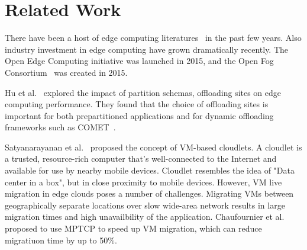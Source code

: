 \section{Related Work}
\label{sec:related}

There have been a host of edge computing literatures~\cite{edge-computing,edgecloudsim,cloudlets09,Cloudlets12,hu-apsys16,ChaufournierSLN17}
in the past few years.
Also industry investment in edge computing have grown dramatically recently.
The Open Edge Computing\cite{url:openedgecomputing} initiative was launched in 2015,
and the Open Fog Consortium~\cite{url:openfog} was created in 2015.

Hu et al.~\cite{hu-apsys16} explored the impact of partition schemas, offloading sites on edge computing performance.
They found that the choice of offloading sites is important for both prepartitioned applications and
for dynamic offloading frameworks such as COMET~\cite{COMET}.

Satyanarayanan et al.~\cite{cloudlets09} proposed the concept of VM-based cloudlets. A cloudlet is a trusted,
resource-rich computer that's well-connected to the Internet and available for use by nearby mobile devices.
Cloudlet resembles the idea of "Data center in a box", but in close proximity to mobile devices.
However, VM live migration in edge clouds poses a number of challenges. Migrating VMs between geographically
separate locations over slow wide-area network results in large migration times and high unavailbility of
the application. Chaufournier et al.~\cite{ChaufournierSLN17} proposed to use MPTCP to speed up VM migration, which can reduce
migratiuon time by up to 50\%.
